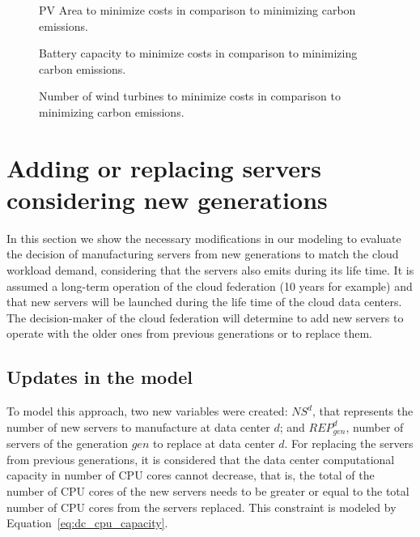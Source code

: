 \begin{figure}[H]
  \centering
  {}
  \caption{PV Area to minimize costs in comparison to minimizing carbon emissions. }
  \label{fig:pv_co2_costs}
\end{figure}


\begin{figure}[H]
  \centering
  {}
  \caption{Battery capacity to minimize costs in comparison to minimizing carbon emissions.  }
  \label{fig:bat_co2_costs}
\end{figure}

\begin{figure}[H]
  \centering
  {}
  \caption{Number of wind turbines  to minimize costs in comparison to minimizing carbon emissions.}
  \label{fig:wt_co2_costs}
\end{figure}


\section{Adding or replacing servers considering new generations }
\label{sec:new_servers}
In this section we show the necessary modifications in our modeling to evaluate the decision of manufacturing servers from new generations to match the cloud workload demand, considering that the servers also emits  during its life time. It is assumed a long-term operation of the cloud federation (10 years for example) and that new servers will be launched during the life time of the cloud data centers. The decision-maker of the cloud federation will determine to add new servers to operate with the older ones from previous generations or to replace them.

\subsection{Updates in the model}

To model this approach, two new variables were created: $NS^d$, that represents the number of new servers to manufacture at data center $d$; and $REP_{gen}^d$, number of servers of the generation $gen$ to replace at data center $d$. For replacing the servers from previous generations, it is considered that the data center computational capacity in number of CPU cores cannot decrease, that is, the total of the number of CPU cores of the new servers needs to be greater or equal to the total number of CPU cores from the servers replaced. This constraint is modeled by Equation~\eqref{eq:dc_cpu_capacity}.

